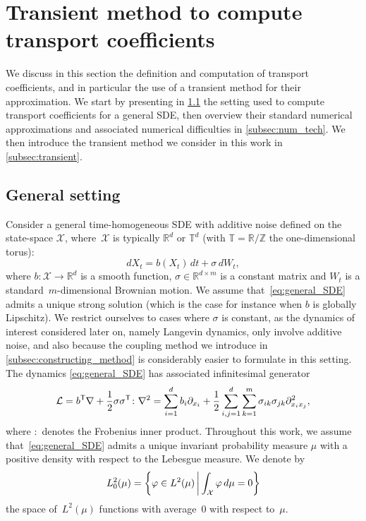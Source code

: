 \documentclass[11pt]{article}
\newcommand{\T}{\mathbb{T}}
\newcommand{\Z}{\mathbb{Z}}
\newcommand{\R}{\mathbb{R}}
\newcommand{\X}{\mathcal{X}}
\renewcommand{\L}{\mathcal{L}}
\renewcommand{\t}{\mathsf T}
\theoremstyle{definition}
\begin{document}
\section{Transient method to compute transport coefficients}
\label{sec:trans_coeff}
We discuss in this section the definition and computation of transport coefficients, and in particular the use of a transient method for their approximation. We start by presenting in \cref{subsec:gen_setting} the setting used to compute transport coefficients for a general SDE, then overview their standard numerical approximations and associated numerical difficulties in \cref{subsec:num_tech}. We then introduce the transient method we consider in this work in \cref{subsec:transient}.

\subsection{General setting}
\label{subsec:gen_setting}
Consider a general time-homogeneous SDE with additive noise defined on the state-space $\mathcal{X}$, where~$\mathcal{X}$ is typically $\R^d$ or $\T^d$ (with $\T = \R/\Z$ the one-dimensional torus):
\begin{equation}
    dX_t = b(X_t) \, dt + \sigma \, dW_t,
    \label{eq:general_SDE}
\end{equation}
where $b\colon \mathcal{X} \to \R^d$ is a smooth function, $\sigma \in \R^{d\times m}$ is a constant matrix and $W_t$ is a standard~$m$-dimensional Brownian motion. We assume that~\eqref{eq:general_SDE} admits a unique strong solution (which is the case for instance when $b$ is globally Lipschitz). We restrict ourselves to cases where $\sigma$ is constant, as the dynamics of interest considered later on, namely Langevin dynamics, only involve additive noise, and also because the coupling method we introduce in \cref{subsec:constructing_method} is considerably easier to formulate in this setting. The dynamics \eqref{eq:general_SDE} has associated infinitesimal generator
\begin{equation}
    \notag
    \L = b^\t\nabla + \frac{1}{2}\sigma\sigma^\t \colon \nabla^2 = \sum_{i=1}^d b_i\partial_{x_i} + \frac{1}{2}\sum_{i,j=1}^d\sum_{k=1}^m \sigma_{ik}\sigma_{jk} \partial_{x_ix_j}^2,
\end{equation}
where $\colon$ denotes the Frobenius inner product. Throughout this work, we assume that~\eqref{eq:general_SDE} admits a unique invariant probability measure $\mu$ with a positive density with respect to the Lebesgue measure. 
We denote by 
\begin{equation}
    \notag
    L^2_0(\mu) = \left\{\varphi \in L^2(\mu) \, \middle| \, \int_\X \varphi \, d\mu = 0\right\}
\end{equation}
the space of~$L^2(\mu)$ functions with average~0 with respect to~$\mu$.
\end{document}
